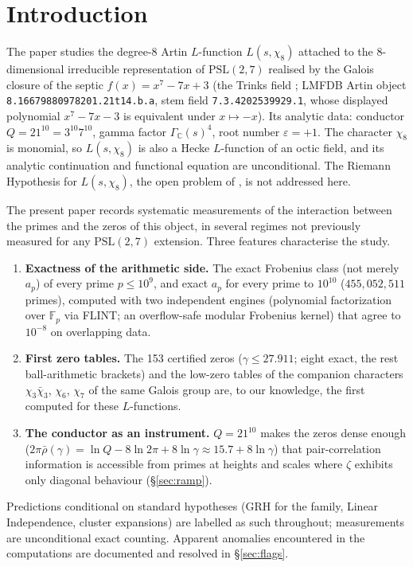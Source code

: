 \documentclass[11pt]{article}
\newcommand{\Lgen}{L(s,\chi_8)}
\begin{document}
\section{Introduction}
The paper \cite{mainpaper} studies the degree-8 Artin $L$-function $\Lgen$
attached to the 8-dimensional irreducible representation of
$\mathrm{PSL}(2,7)$ realised by the Galois closure of the septic
$f(x)=x^7-7x+3$ (the Trinks field \cite{trinks}; LMFDB \cite{lmfdb} Artin
object \texttt{8.16679880978201.21t14.b.a}, stem field
\texttt{7.3.4202539929.1}, whose displayed polynomial $x^7-7x-3$ is equivalent
under $x\mapsto-x$). Its analytic data: conductor $Q=21^{10}=3^{10}7^{10}$,
gamma factor $\Gamma_{\mathbb C}(s)^4$, root number $\varepsilon=+1$. The
character $\chi_8$ is monomial, so $\Lgen$ is also a Hecke $L$-function of an
octic field, and its analytic continuation and functional equation are
unconditional. The Riemann Hypothesis for $\Lgen$, the open problem of
\cite{mainpaper}, is not addressed here.

The present paper records systematic measurements of the interaction between
the primes and the zeros of this object, in several regimes not previously
measured for any $\mathrm{PSL}(2,7)$ extension. Three features characterise
the study.

\begin{enumerate}
\item \textbf{Exactness of the arithmetic side.} The exact Frobenius class
(not merely $a_p$) of every prime $p\le 10^9$, and exact $a_p$ for every
prime to $10^{10}$ ($455{,}052{,}511$ primes), computed with two independent
engines (polynomial factorization over $\mathbb F_p$ via FLINT; an
overflow-safe modular Frobenius kernel) that agree to $10^{-8}$ on
overlapping data.
\item \textbf{First zero tables.} The 153 certified zeros ($\gamma\le27.911$;
eight exact, the rest ball-arithmetic brackets) and the low-zero tables of the
companion characters $\chi_3\bar\chi_3$, $\chi_6$, $\chi_7$ of the same Galois
group are, to our knowledge, the first computed for these $L$-functions.
\item \textbf{The conductor as an instrument.} $Q=21^{10}$ makes the zeros
dense enough ($2\pi\bar\rho(\gamma)=\ln Q-8\ln2\pi+8\ln\gamma\approx
15.7+8\ln\gamma$) that pair-correlation information is accessible from primes
at heights and scales where $\zeta$ exhibits only diagonal behaviour
(\S\ref{sec:ramp}).
\end{enumerate}

Predictions conditional on standard hypotheses (GRH for the family, Linear
Independence, cluster expansions) are labelled as such throughout;
measurements are unconditional exact counting. Apparent anomalies encountered
in the computations are documented and resolved in \S\ref{sec:flags}.
\end{document}

